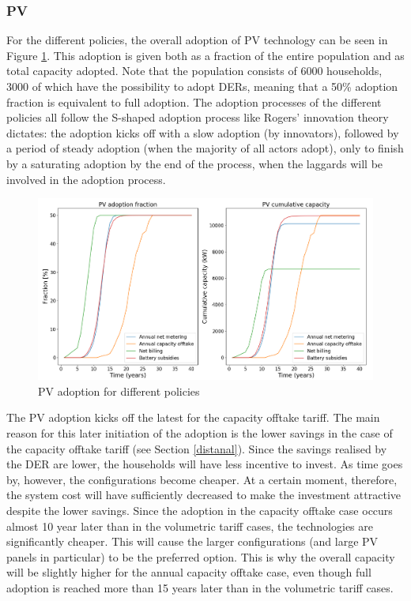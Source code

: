 \subsubsection{PV}
For the different policies, the overall adoption of PV  technology can be seen in Figure \ref{Figure:PVvolpolicies}. This adoption is given both as a fraction of the entire population and as total capacity adopted. Note that the population consists of 6000 households, 3000 of which have the possibility to adopt DERs, meaning that a 50\% adoption fraction is equivalent to full adoption. The adoption processes of the different policies all follow the S-shaped adoption process like Rogers' innovation theory dictates: the adoption kicks off with a slow adoption (by innovators), followed by a period of steady adoption (when the majority of all actors adopt), only to finish by a saturating adoption by the end of the process, when the laggards will be involved in the adoption process. 
\begin{figure}[h!]
\centering
\includegraphics[width=12cm]{Policies/PV.png}
\caption{PV adoption for different policies}
\label{Figure:PVvolpolicies}
\end{figure}
\noindent
The PV adoption kicks off the latest for the capacity offtake tariff. The main reason for this later initiation of the adoption is the lower savings in the case of the capacity offtake tariff (see Section \ref{distanal}). Since the savings realised by the DER are lower, the households will have less incentive to invest. As time goes by, however, the configurations become cheaper. At a certain moment, therefore, the system cost will have sufficiently decreased to make the investment attractive despite the lower savings. Since the adoption in the capacity offtake case occurs almost 10 year later than in the volumetric tariff cases, the technologies are significantly cheaper. This will cause the larger configurations (and large PV panels in particular) to be the preferred option. This is why the overall capacity will be slightly higher for the annual capacity offtake case, even though full adoption is reached more than 15 years later than in the volumetric tariff cases. 
